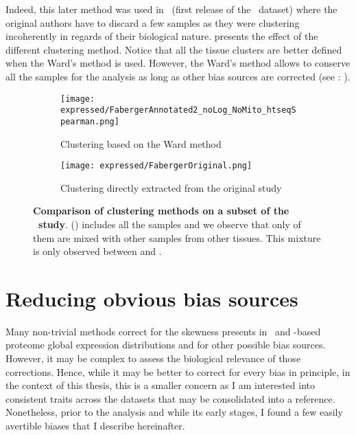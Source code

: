 Indeed, this later method was used in~
(first release of the \uhlen\ dataset) where
the original authors have to discard a few samples as they were clustering
incoherently in regards of their biological nature.
 presents the effect of the different clustering
method.
Notice that all the tissue clusters are better defined when the Ward's
method is used.
However, the Ward's method allows to conserve all the samples for the analysis
as long as other bias sources are corrected (see : ).
\begin{figure}[!htpb]
    \centering
       \begin{subfigure}[hp]{0.70\textwidth}
       \centering \texttt{[image: expressed/FabergerAnnotated2\_noLog\_NoMito\_htseqSpearman.png]}
    \caption{Clustering based on the Ward method}\label{fig:FabergerRedone}
   \end{subfigure}

     \begin{subfigure}[hp]{0.70\textwidth}
      \centering \texttt{[image: expressed/FabergerOriginal.png]}
      \caption{Clustering directly extracted from the original study
      {\footnotesize {}}}\label{fig:fabergerOriginal}
       \end{subfigure}
    \caption[Comparison of clustering methods on a subset of the \uhlen\ study]{%
    \textbf{Comparison of clustering methods on a subset of the \uhlen\ study}.
    () includes all the samples and
    we observe that only of them are mixed with other samples from other tissues.
    This mixture is only observed between   and .
 }\label{fig:versusFaberger}
\end{figure}

\section{Reducing obvious bias sources}\label{sec:bias_sources}

Many non-trivial methods correct for the skewness presents in
\Rnaseq\ and \ms-based proteome global expression distributions
and for other possible bias sources.
However, it may be complex to assess the biological relevance of those corrections.
Hence, while it may be better to correct for every bias in principle,
in the context of this thesis, this is a smaller concern as I am interested into
consistent traits across the datasets that may be consolidated into a reference.
Nonetheless, prior to the analysis and while its early stages,
I found a few easily avertible biases that I describe hereinafter.

